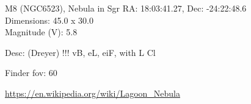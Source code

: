 \begin{block}{M8 (NGC6523), Nebula in Sgr}
    RA: 18:03:41.27, Dec: -24:22:48.6 \\ 
    Dimensions: 45.0 x 30.0 \\ 
    Magnitude (V): 5.8


    Desc: (Dreyer) !!! vB, eL, eiF, with L Cl 

    Finder fov: 60 

    \url{https://en.wikipedia.org/wiki/Lagoon_Nebula} 
\end{block}